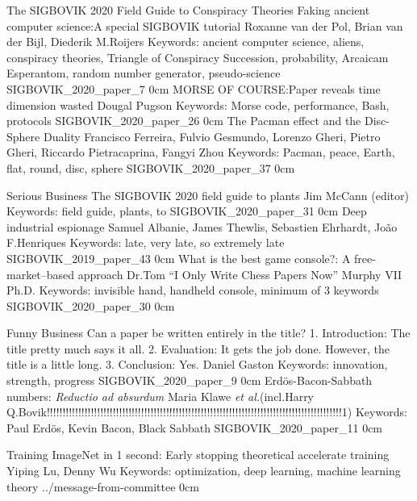 \addtrack
	{}{The SIGBOVIK 2020 Field Guide to Conspiracy Theories}
\addpaper
	{Faking ancient computer science:\@ A special SIGBOVIK tutorial}
	{Roxanne van der Pol, Brian van der Bijl, Diederik M.\@ Roijers}
	{Keywords: ancient computer science, aliens, conspiracy theories, Triangle of Conspiracy Succession, probability, Arcaicam Esperantom, random number generator, pseudo-science}
	{SIGBOVIK_2020_paper_7}
	{0cm}
	{}
\addpaper
	{MORSE OF COURSE:\@ Paper reveals time dimension wasted}
	{Dougal Pugson}
	{Keywords: Morse code, performance, Bash, protocols}
	{SIGBOVIK_2020_paper_26}
	{0cm}
	{}
\addpaper
	{The Pacman effect and the Disc-Sphere Duality}
	{Francisco Ferreira, Fulvio Gesmundo, Lorenzo Gheri, Pietro Gheri, Riccardo Pietracaprina, Fangyi Zhou}
	{Keywords: Pacman, peace, Earth, flat, round, disc, sphere}
	{SIGBOVIK_2020_paper_37}
	{0cm}
	{}

\addtrack
	{}{Serious Business}
\addpaper
	{The SIGBOVIK 2020 field guide to plants}
	{Jim McCann (editor)}
	{Keywords: field guide, plants, to}
	{SIGBOVIK_2020_paper_31}
	{0cm}
	{}
\addpaper
	{Deep industrial espionage}
	{Samuel Albanie, James Thewlis, Sebastien Ehrhardt, Jo\~ao F.\@ Henriques}
	{Keywords: late, very late, so extremely late}
	{SIGBOVIK_2019_paper_43}
	{0cm}
	{}
\addpaper
	{What is the best game console?: A free-market--based approach}
	{Dr.\@ Tom ``I Only Write Chess Papers Now'' Murphy VII Ph.D.}
	{Keywords: invisible hand, handheld console, minimum of 3 keywords}
	{SIGBOVIK_2020_paper_30}
	{0cm}
	{}

\addtrack
	{}{Funny Business}
\addpaper
	{Can a paper be written entirely in the title? 1. Introduction: The title pretty much says it all. 2. Evaluation: It gets the job done. However, the title is a little long. 3. Conclusion: Yes.}
	{Daniel Gaston}
	{Keywords: innovation, strength, progress}
	{SIGBOVIK_2020_paper_9}
	{0cm}
	{}
\addpaper
	{Erd\"os-Bacon-Sabbath numbers: \textit{Reductio ad absurdum}}
	{Maria Klawe \textit{et al.}\@ (incl.\@ Harry Q.\@ Bovik!!!!!!!!!!!!!!!!!!!!!!!!!!!!!!!!!!!!!!!!!!!!!!!!!!!!!!!!!!!!!!!!!!!!!!!!!!!!!!!!!!!!!!!!!!!!!!1)}
	{Keywords: Paul Erd\"os, Kevin Bacon, Black Sabbath}
	{SIGBOVIK_2020_paper_11}
	{0cm}
	{}

\addpaper
	{Training ImageNet in 1 second: Early stopping theoretical accelerate training}
	{Yiping Lu, Denny Wu}
	{Keywords: optimization, deep learning, machine learning theory}
	{../message-from-committee}
	{0cm}
	{}
